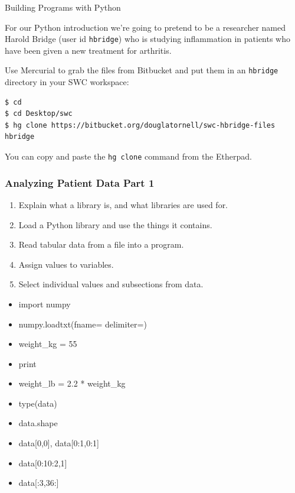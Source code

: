 \documentclass[xcolor=dvipsnames]{beamer}
\begin{document}
\begin{frame}
\begin{center}{\Huge Building Programs with Python}
\end{center}
\end{frame}


\begin{frame}[fragile]
For our Python introduction we're going to pretend to be a researcher named Harold Bridge (user id {\tt hbridge}) who is studying inflammation in patients who have been given a new treatment for arthritis.

Use Mercurial to grab the files from Bitbucket and put them in an {\tt hbridge} directory in your SWC workspace:
{\footnotesize
\begin{verbatim}
$ cd
$ cd Desktop/swc
$ hg clone https://bitbucket.org/douglatornell/swc-hbridge-files hbridge
\end{verbatim}
}

You can copy and paste the {\tt hg clone} command from the Etherpad.
\end{frame}


\begin{frame}
\frametitle{Analyzing Patient Data Part 1}
\begin{enumerate}
\item    Explain what a library is, and what libraries are used for.
\item    Load a Python library and use the things it contains.
\item    Read tabular data from a file into a program.
\item    Assign values to variables.
\item    Select individual values and subsections from data.
\end{enumerate}

\begin{multicols}{2}
\begin{itemize}
\item import numpy
\item numpy.loadtxt(fname=  delimiter=)
\item weight\_kg = 55
\item print
\item weight\_lb = 2.2 * weight\_kg
\item type(data)
\item data.shape
\item data[0,0], data[0:1,0:1]
\item data[0:10:2,1]
\item data[:3,36:]
\end{itemize}
\end{multicols}
\end{frame}
\end{document}

